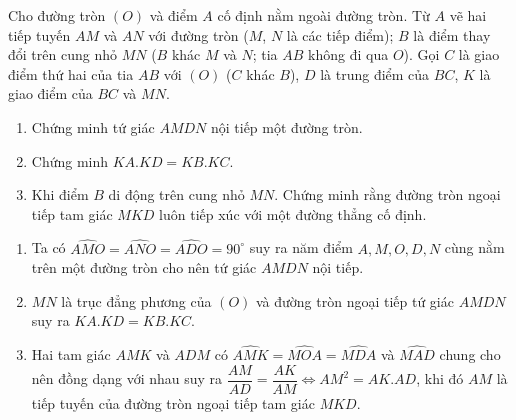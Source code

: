 \begin{bt}%
	Cho đường tròn $(O)$ và điểm $A$ cố định nằm ngoài đường tròn. Từ $A$ vẽ hai tiếp tuyến $AM$ và $AN$ với đường tròn ($M$, $N$ là các tiếp điểm); $B$ là điểm thay đổi trên cung nhỏ $MN$ ($B$ khác $M$ và $N$; tia $AB$ không đi qua $O$). Gọi $C$ là giao điểm thứ hai của tia $AB$ với $(O)$ ($C$ khác $B$), $D$ là trung điểm của $BC$, $K$ là giao điểm của $BC$ và $MN$.
	\begin{enumerate}
		\item Chứng minh tứ giác $AMDN$ nội tiếp một đường tròn.
		\item  Chứng minh $KA.KD=KB.KC$.
		\item  Khi điểm $B$ di động trên cung nhỏ $MN$. Chứng minh rằng đường tròn ngoại tiếp tam giác $MKD$ luôn tiếp xúc với một đường thẳng cố định.
	\end{enumerate}
	\loigiai
	{
		\begin{center}
		\end{center}
		\begin{enumerate}
			\item Ta có  $\widehat{AMO}=\widehat{ANO} =\widehat{ADO} =90^\circ$ suy ra năm điểm $A,M,O,D,N$  cùng nằm trên một đường tròn cho nên tứ giác $AMDN$ nội tiếp.
			\item  $MN$ là trục đẳng phương của $(O)$ và đường tròn ngoại tiếp tứ giác $AMDN$ suy ra $KA.KD=KB.KC$. 
			\item Hai tam giác $AMK$ và $ADM$ có $\widehat{AMK} = \widehat{MOA}=\widehat{MDA}$ và $\widehat{MAD}$ chung cho nên đồng dạng với nhau suy ra $\dfrac{AM}{AD}=\dfrac{AK}{AM} \Leftrightarrow AM^2= AK.AD$, khi đó $AM$ là tiếp tuyến của đường tròn ngoại tiếp tam giác $MKD$.  
		\end{enumerate}
	}
\end{bt}

